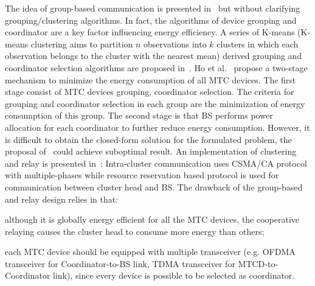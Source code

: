 The idea of group-based communication is presented in~\cite{kim2010snoop} but without clarifying grouping/clustering algorithms. In fact, the algorithms of device grouping and coordinator are a key factor influencing energy efficiency. A series of K-means (K-means clustering aims to partition $n$ observations into $k$ clusters in which each observation belongs to the cluster with the nearest mean) derived grouping and coordinator selection algorithms are proposed in~\cite{CYTu11}. Ho et al.~\cite{YuanHo12} propose a two-stage mechanism to minimize the energy consumption of all MTC devices. The first stage consist of MTC devices grouping, coordinator selection. The criteria for grouping and coordinator selection in each group are the minimization of energy consumption of this group. The second stage is that BS performs power allocation for each coordinator to further reduce energy consumption. However, it is difficult to obtain the closed-form solution for the formulated problem, the proposal of~\cite{YuanHo12} could achieve suboptimal result. 
An implementation of clustering and relay is presented in~\cite{azari14}: Intra-cluster communication uses CSMA/CA protocol with multiple-phases while resource reservation based protocol is used for communication between cluster head and BS. The drawback of the group-based and relay design relies in that:\begin{inparaenum}[(i)]
	\item although it is globally energy efficient for all the MTC devices, the cooperative relaying causes the cluster head to consume more energy than others;
	\item each MTC device should be equipped with multiple transceiver (e.g. OFDMA transceiver for Coordinator-to-BS link, TDMA transceiver for MTCD-to-Coordinator link), since every device is possible to be selected as coordinator.
\end{inparaenum}


